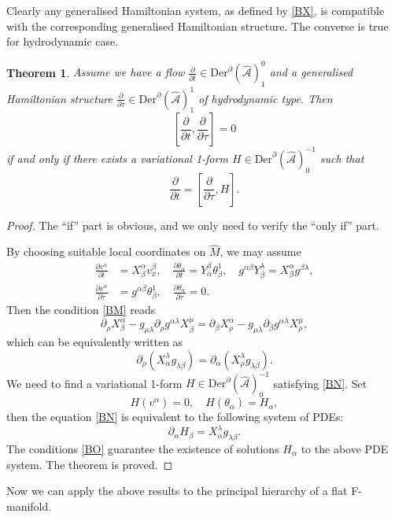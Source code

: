 \documentclass[11pt,a4paper]{amsart}
\numberwithin{equation}{section}
\newtheorem{theorem}{Theorem}[section]
\newcommand{\derx}{\mathrm{Der}^{\qp}(\hm A)}
\newcommand{\diff}[2]{\frac{\partial #1}{\partial #2}}
\newcommand{\qa}{\alpha}
\newcommand{\qb}{\beta}
\newcommand{\qt}{\tau}
\newcommand{\qth}{\theta}
\newcommand{\qp}{\partial}
\newcommand{\ql}{\lambda}
\newcommand{\hm}[1]{\hat{\mathcal #1}}
\newcommand{\kk}[1]{\left(#1\right)}
\newcommand{\fk}[2]{\left[#1, #2\right]}
\numberwithin{equation}{section}
\begin{document}
Clearly any generalised Hamiltonian system, as defined by \eqref{BX}, is compatible with the corresponding generalised Hamiltonian structure. The converse is true for hydrodynamic case.
\begin{theorem}
    Assume we have a flow $\diff{}{t}\in\derx^0_1$ and a generalised Hamiltonian structure $\diff{}{\qt}\in\derx^1_1$ of hydrodynamic type. Then 
    \begin{equation}
        \label{BM}
    \fk{\diff{}{t}}{\diff{}{\qt}} = 0
    \end{equation}
    if and only if there exists a variational 1-form $H\in\derx^{-1}_0$ such that 
    \begin{equation}
        \label{BN}
    \diff{}{t} = \fk{\diff{}{\qt}}{H}.
    \end{equation}
\end{theorem}
\begin{proof}
The ``if'' part is obvious, and we only need to verify the ``only if'' part.

By choosing suitable local coordinates on $\hat M$, we may assume 
\begin{align*}
 \diff{v^\qa}{t} &= X^\qa_\qb v_x^\qb,\quad \diff{\qth_\qa}{t} = Y^\qb_\qa\qth_\qb^1,\quad g^{\qa\qb}Y^\ql_\qb = X^\qa_\qb g^{\qb\ql},\\
 \diff{v^\qa}{\qt} &=g^{\qa\qb}\qth_\qb^1,\quad \diff{\qth_\qa}{\qt} = 0.
\end{align*}
Then the condition \eqref{BM} reads
\[
\qp_\rho X^\qa_\qb-g_{\mu\ql}\qp_\rho g^{\qa\ql} X^\mu_\qb = \qp_\qb X^\qa_\rho-g_{\mu\ql}\qp_\qb g^{\qa\ql} X^\mu_\rho,
\]
which can be equivalently written as 
\begin{equation}
    \label{BO}
    \qp_\rho\kk{X^\ql_\qa g_{\ql\qb}} = \qp_\qa\kk{X^\ql_\rho g_{\ql\qb}}. 
\end{equation}
We need to find a variational 1-form $H\in\derx^{-1}_0$ satisfying \eqref{BN}. Set
\[
H(v^\qa) = 0,\quad H(\qth_\qa) = H_\qa,
\]
then the equation \eqref{BN} is equivalent to the following system of PDEs:
\[
\qp_\qa H_\qb = X^\ql_\qa g_{\ql\qb}.
\]
The conditions \eqref{BO} guarantee the existence of solutions $H_\qa$ to the above PDE system. The theorem is proved.
\end{proof}


Now we can apply the above results to the principal hierarchy of a flat F-manifold.
\end{document}
